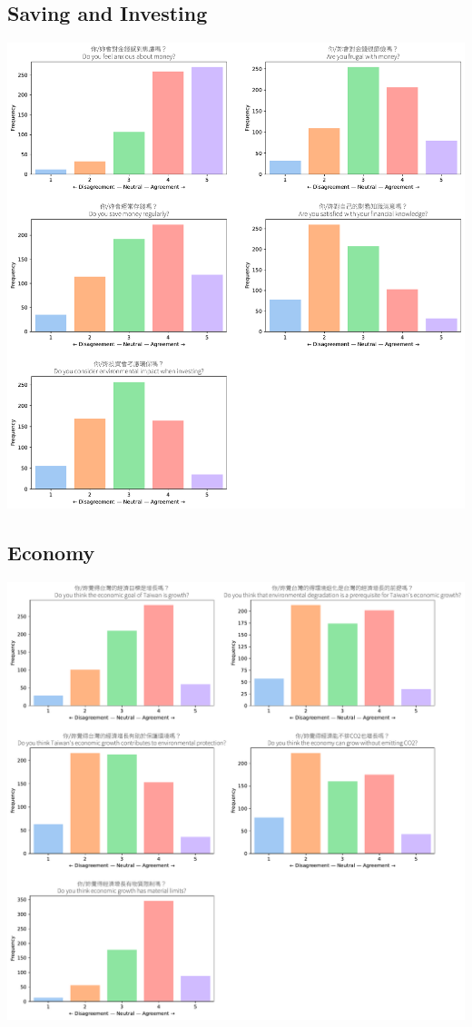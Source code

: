 \documentclass[
  letterpaper,
  DIV=11,
  numbers=noendperiod]{scrartcl}
\begin{document}
\subsection{Saving and Investing}\label{saving-and-investing}

\includegraphics{_thesis_files/figure-pdf/cell-12-output-1.pdf}

\subsection{Economy}\label{economy}

\includegraphics{_thesis_files/figure-pdf/cell-13-output-1.pdf}
\end{document}
